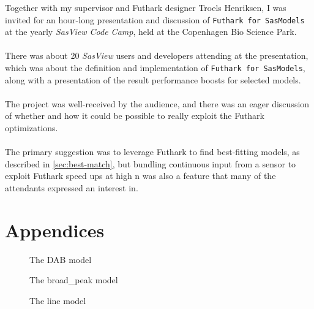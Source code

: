 \documentclass[11pt]{article}
\newcommand{\sasview}{\textit{SasView}}
\newcommand{\futhark}{\texttt{Futhark for SasModels}}
\begin{document}
\begin{mdframed}[
    frametitle={Why does Futhark perform faster than OpenCL?},
    nobreak=true]
\begin{mdframed}[
  frametitle={Presentation at \sasview{} Code Camp},
  nobreak=true
  ]
Together with my supervisor and Futhark designer Troels Henriksen,
I was invited for an hour-long presentation and discussion of \futhark{} at the
yearly \textit{SasView Code Camp}, held at the Copenhagen Bio Science Park.\\\\
There was about 20 \sasview{} users and developers attending at the presentation,
which was about the definition and implementation of \futhark{}, along with
a presentation of the result performance boosts for selected models.\\\\
The project was well-received by the audience, and there was an eager discussion
of whether and how it could be possible to really exploit the Futhark
optimizations.\\\\
The primary suggestion was to leverage Futhark to find best-fitting models,
as described in \ref{sec:best-match}, but bundling continuous input from
a sensor to exploit Futhark speed ups at high n was also a feature that many
of the attendants expressed an interest in.
\end{mdframed}





\section*{Appendices}

\begin{figure}
  
  \label{fig:dabmodel}
  \caption{The DAB model}
\end{figure}

\begin{figure}
  
  \label{fig:broadpeakmodel}
  \caption{The broad_peak model}
\end{figure}

\begin{figure}
  
  \label{fig:linemodel}
  \caption{The line model}
\end{figure}


\end{mdframed}
\end{document}
